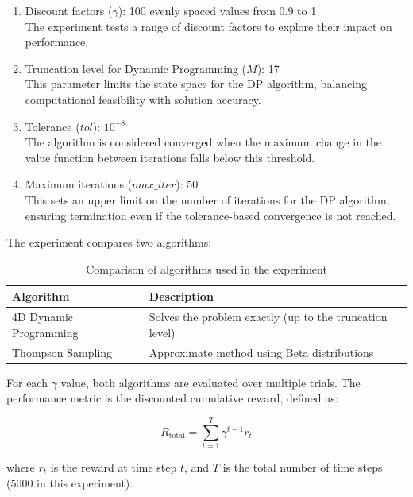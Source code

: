 \documentclass[11pt]{article}
\begin{document}
\begin{enumerate}
    \item Discount factors ($\gamma$): 100 evenly spaced values from 0.9 to 1
    \\ The experiment tests a range of discount factors to explore their impact on performance.

    \item Truncation level for Dynamic Programming ($M$): 17
    \\ This parameter limits the state space for the DP algorithm, balancing computational feasibility with solution accuracy.

    \item Tolerance ($tol$): $10^{-8}$
    \\ The algorithm is considered converged when the maximum change in the value function between iterations falls below this threshold.
    
    \item Maximum iterations ($max\_iter$): 50
    \\ This sets an upper limit on the number of iterations for the DP algorithm, ensuring termination even if the tolerance-based convergence is not reached.
\end{enumerate}

The experiment compares two algorithms:

\begin{table}[h]
\centering
\begin{tabular}{|l|l|}
\hline
\textbf{Algorithm} & \textbf{Description} \\
\hline
4D Dynamic Programming & Solves the problem exactly (up to the truncation level) \\
\hline
Thompson Sampling & Approximate method using Beta distributions \\
\hline
\end{tabular}
\caption{Comparison of algorithms used in the experiment}
\label{tab:algorithms}
\end{table}

For each $\gamma$ value, both algorithms are evaluated over multiple trials. The performance metric is the discounted cumulative reward, defined as:

\begin{equation*}
R_{\text{total}} = \sum_{t=1}^{T} \gamma^{t-1} r_t
\end{equation*}

where $r_t$ is the reward at time step $t$, and $T$ is the total number of time steps (5000 in this experiment).
\end{document}
